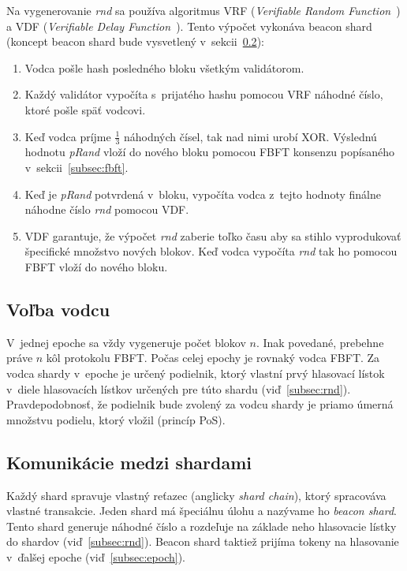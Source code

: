 Na vygenerovanie \textit{rnd} sa používa algoritmus VRF (\textit{Verifiable Random Function~\cite{algorandGilad}}) a VDF (\textit{Verifiable Delay Function~\cite{vdfBoneh}}). Tento výpočet vykonáva beacon shard (koncept beacon shard bude vysvetlený v~sekcii~\ref{subsec:cross-com}):
\begin{enumerate}
	\item Vodca pošle hash posledného bloku všetkým validátorom.
	\item Každý validátor vypočíta s~prijatého hashu pomocou VRF náhodné číslo, ktoré pošle späť vodcovi.
	\item Keď vodca príjme $\frac{1}{3}$ náhodných čísel, tak nad nimi urobí XOR. Výslednú hodnotu \textit{pRand} vloží do nového bloku pomocou FBFT konsenzu popísaného v~sekcii~\ref{subsec:fbft}.
	\item Keď je \textit{pRand} potvrdená v~bloku, vypočíta vodca z~tejto hodnoty finálne náhodne číslo \textit{rnd} pomocou VDF.
	\item VDF garantuje, že výpočet \textit{rnd} zaberie toľko času aby sa stihlo vyprodukovať špecifické množstvo nových blokov. Keď vodca vypočíta \textit{rnd} tak ho pomocou FBFT vloží do nového bloku.
\end{enumerate}

\subsection{Voľba vodcu}
V~jednej epoche sa vždy vygeneruje počet blokov $n$. Inak povedané, prebehne práve $n$ kôl protokolu FBFT. Počas celej epochy je rovnaký vodca FBFT. Za vodca shardy v~epoche je určený podielnik, ktorý vlastní prvý hlasovací lístok v~diele hlasovacích lístkov určených pre túto shardu (viď~\ref{subsec:rnd}). Pravdepodobnosť, že podielnik bude zvolený za vodcu shardy je priamo úmerná množstvu podielu, ktorý vložil (princíp PoS).

\subsection{Komunikácie medzi shardami}\label{subsec:cross-com}
Každý shard spravuje vlastný reťazec (anglicky \textit{shard chain}), ktorý spracováva vlastné transakcie. Jeden shard má špeciálnu úlohu a nazývame ho \textit{beacon shard}. Tento shard generuje náhodné číslo a rozdeľuje na základe neho hlasovacie lístky do shardov (viď~\ref{subsec:rnd}). Beacon shard taktiež prijíma tokeny na hlasovanie v~ďalšej epoche (viď~\ref{subsec:epoch}).


